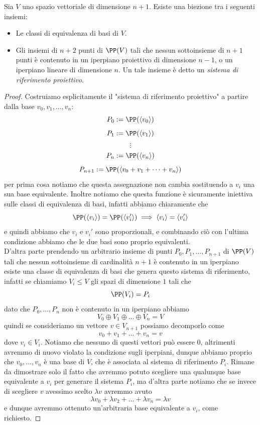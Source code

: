 \documentclass[11pt]{scrartcl}
\begin{document}
   	 \begin{proposition}
   	 	Sia $V$ uno spazio vettoriale di dimensione $n+1$. Esiste una biezione tra i seguenti insiemi:
   	 	\begin{itemize}
   	 		\item Le classi di equivalenza di basi di $V$.
   	 		\item Gli insiemi di $n+2$ punti di $\PP(V)$ tali che nessun sottoinsieme di $n+1$ punti è contenuto in un iperpiano proiettivo di dimensione $n-1$, o un iperpiano lineare di dimensione $n$. Un tale insieme è detto un \textit{sistema di riferimento proiettivo}.
   	 	\end{itemize}
   	 \end{proposition}
   	 \begin{proof}
   	 	Costruiamo esplicitamente il "sistema di riferimento proiettivo" a partire dalla base $v_0,v_1,\dots,v_n$:
   	 	$$P_0:=\PP(\langle v_0\rangle)$$
   	 	$$P_1:=\PP(\langle v_1\rangle)$$
   	 	$$\vdots$$
   	 	$$P_n:=\PP(\langle v_n\rangle)$$
   	 	$$P_{n+1}:=\PP(\langle v_0+v_1+\dots+v_n\rangle)$$
   	 	per prima cosa notiamo che questa assegnazione non cambia sostituendo a $v_i$ una sua base equivalente. Inoltre notiamo che questa funzione è sicuramente iniettiva sulle classi di equivalenza di basi, infatti abbiamo chiaramente che 
   	 	$$\PP(\langle v_i\rangle)=\PP(\langle v'_i\rangle) \implies \langle v_i\rangle = \langle v'_i\rangle$$
   	 	e quindi abbiamo che $v_i$ e $v_i'$ sono proporzionali, e combinando ciò con l'ultima condizione abbiamo che le due basi sono proprio equivalenti. \\
   	 	D'altra parte prendendo un arbitrario insieme di punti $P_0,P_1,\dots,P_{n+1}$ di $\PP(V)$ tali che nessun sottoinsieme di cardinalità $n+1$ è contenuto in un iperpiano esiste una classe di equivalenza di basi che genera questo sistema di riferimento, infatti se chiamiamo $V_i\le V$ gli spazi di dimensione $1$ tali che
   	 	$$\PP(V_i)=P_i$$
   	 	dato che $P_0,\dots,P_n$ non è contenuto in un iperpiano abbiamo
   	 	$$V_0\oplus V_1 \oplus \dots \oplus V_n=V$$
   	 	quindi se consideriamo un vettore $v\in V_{n+1}$ possiamo decomporlo come
   	 	$$v_0+v_1+\dots+v_n=v$$
   	 	dove $v_i\in V_i$. Notiamo che nessuno di questi vettori può essere $0$, altrimenti avremmo di nuovo violato la condizione sugli iperpiani, dunque abbiamo proprio che $v_0,\dots,v_n$ è una base di $V$, che è associata al sistema di riferimento $P_i$. Rimane da dimostrare solo il fatto che avremmo potuto scegliere una qualunque base equivalente a $v_i$ per generare il sistema $P_i$, ma d'altra parte notiamo che se invece di scegliere $v$ avessimo scelto $\lambda v$ avremmo avuto
   	 	$$\lambda v_0+\lambda v_2+\dots +\lambda v_n=\lambda v$$
   	 	e dunque avremmo ottenuto un'arbitraria base equivalente a $v_i$, come richiesto.
   	 \end{proof}
\end{document}
